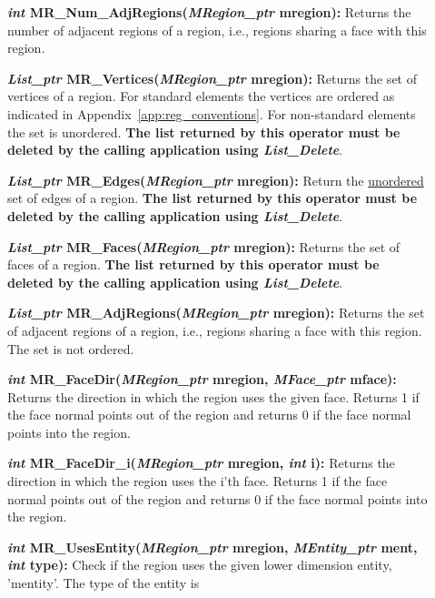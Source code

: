 \documentclass[12pt]{article}
\begin{document}
\begin{description}
\item[]{\bf {\em int} MR\_Num\_AdjRegions({\em MRegion\_ptr}
mregion):} Returns the number of adjacent regions of a region, i.e.,
regions sharing a face with this region.

\item[] 

\item[]{\bf {\em List\_ptr} MR\_Vertices({\em MRegion\_ptr}
mregion):} Returns the set of vertices of a region. For standard
elements the vertices are ordered as indicated in
Appendix~\ref{app:reg_conventions}. For non-standard elements the set
is unordered. {\bf The list returned by this
  operator must be deleted by the calling application using {\em List\_Delete}}.

\item[]{\bf {\em List\_ptr} MR\_Edges({\em MRegion\_ptr} mregion):}
Return the \underline{unordered} set of edges of a region.  {\bf The list returned by this
  operator must be deleted by the calling application using {\em List\_Delete}}.

\item[]{\bf {\em List\_ptr} MR\_Faces({\em MRegion\_ptr} mregion):}
Returns the set of faces of a region. {\bf The list returned by this
  operator must be deleted by the calling application using {\em List\_Delete}}.

\item[]{\bf {\em List\_ptr} MR\_AdjRegions({\em MRegion\_ptr}
mregion):} Returns the set of adjacent regions of a region, i.e.,
regions sharing a face with this region. The set is not ordered.

\item[]{\bf {\em int} MR\_FaceDir({\em MRegion\_ptr} mregion,
{\em MFace\_ptr} mface):} Returns the direction in which the region
uses the given face. Returns 1 if the face normal points out of the
region and returns 0 if the face normal points into the region.

\item[]{\bf {\em int} MR\_FaceDir\_i({\em MRegion\_ptr} mregion,
{\em int} i):} Returns the direction in which the region uses the
i'th face. Returns 1 if the face normal points out of the region and
returns 0 if the face normal points into the region.


\item[]

\item[]{\bf {\em int} MR\_UsesEntity({\em MRegion\_ptr} mregion,
{\em MEntity\_ptr} ment, {\em int} type):} Check if the region
uses the given lower dimension entity, 'mentity'. The type of the
entity is


\end{description}
\end{document}
